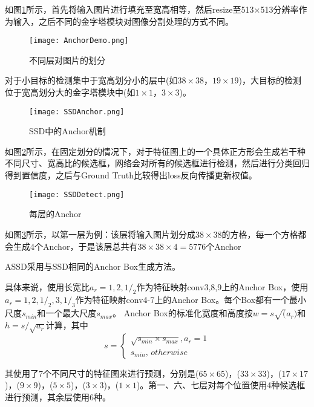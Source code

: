 
如图\ref{AnchorDemo}所示，首先将输入图片进行填充至宽高相等，然后resize至513×513分辨率作为输入，之后不同的金字塔模块对图像分割处理的方式不同。

\begin{figure}
	\center
	{\texttt{[image: AnchorDemo.png]}}
	\caption{不同层对图片的划分}
	\label{AnchorDemo}
\end{figure}


对于小目标的检测集中于宽高划分小的层中(如$38\times 38$，$19\times 19$)，大目标的检测位于宽高划分大的金字塔模块中(如$1\times 1$，$3\times $3)。

\begin{figure}
	\center
	{\texttt{[image: SSDAnchor.png]}}
	\caption{SSD中的Anchor机制}
	\label{SSDAnchor}
\end{figure}

如图\ref{SSDAnchor}所示，在固定划分的情况下，对于特征图上的一个具体正方形会生成若干种不同尺寸、宽高比的候选框，网络会对所有的候选框进行检测，然后进行分类回归得到置信度，之后与Ground Truth比较得出loss反向传播更新权值。

\begin{figure}
	\center
	{\texttt{[image: SSDDetect.png]}}
	\caption{每层的Anchor}
	\label{SSDDetect}
\end{figure}

如图\ref{SSDDetect}所示，以第一层为例：该层将输入图片划分成$38\times 38$的方格，每一个方格都会生成4个Anchor，于是该层总共有$38\times 38\times 4=5776$个Anchor

ASSD采用与SSD相同的Anchor Box生成方法。

具体来说，使用长宽比$a_{r}={1,2,1/_2}$作为特征映射conv3,8,9上的Anchor Box，使用$a_{r}={1,2,1/_2,3,1/_3}$作为特征映射conv4-7上的Anchor Box。每个Box都有一个最小尺度$s_{min}$和一个最大尺度$s_{max}$。
Anchor Box的标准化宽度和高度按$w=s\sqrt(a_{r} )$和$h=s/\sqrt{a_{r}}$计算，其中
\begin{equation}
s=\left\{\begin{matrix}
\sqrt{s_{min}\times s_{max}},a_{r}=1\\ 
s_{min},\,otherwise
\end{matrix}\right.
\end{equation}


其使用了7个不同尺寸的特征图来进行预测，分别是($65\times 65$)，($33\times 33$)，($17\times 17$)，($9\times 9$)，($5\times 5$)，($3\times 3$)，($1\times 1$)。第一、六、七层对每个位置使用4种候选框进行预测，其余层使用6种。

